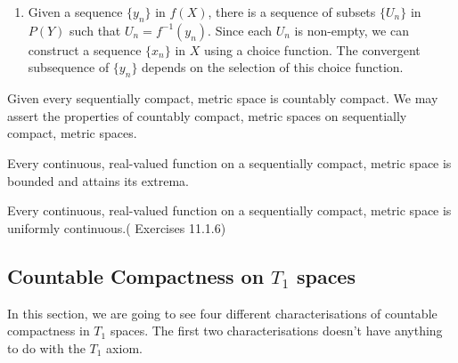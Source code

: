 \begin{remark}
	\begin{enumerate}
		\item Given a sequence $\{y_n\}$ in $f(X)$, there is a sequence of subsets $\{U_n\}$ in $P(Y)$ such that $U_n = f^{-1}(y_n)$. Since each $U_n$ is non-empty, we can construct a sequence $\{x_n\}$ in $X$ using a choice function. The convergent subsequence of $\{y_n\}$ depends on the selection of this choice function.
	\end{enumerate}
\end{remark}

Given every sequentially compact, metric space is countably compact. We may assert the properties of countably compact, metric spaces on sequentially compact, metric spaces.

\begin{theorem}
	Every continuous, real-valued function on a sequentially compact, metric space is bounded and attains its extrema.
\end{theorem}

\begin{theorem}
	Every continuous, real-valued function on a sequentially compact, metric space is uniformly continuous.(\cite{joshi} Exercises 11.1.6)
\end{theorem}

\subsection{Countable Compactness on $T_1$ spaces}
	In this section, we are going to see four different characterisations of countable compactness in $T_1$ spaces.	The first two characterisations doesn't have anything to do with the $T_1$ axiom.


